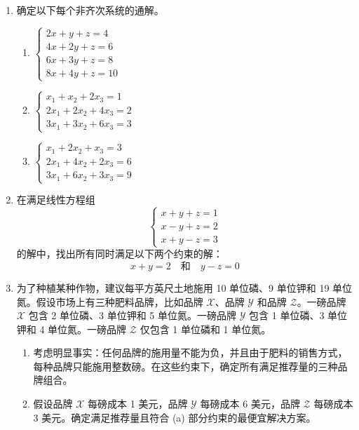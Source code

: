 \begin{enumerate}[leftmargin=*, label=\bfseries 2.5.\arabic*]
\item 确定以下每个非齐次系统的通解。
\begin{enumerate}[label=(\alph*)]
    \item \(
    \begin{cases}
    2x + y + z = 4 \\
    4x + 2y + z = 6 \\
    6x + 3y + z = 8 \\
    8x + 4y + z = 10
    \end{cases}
    \)
    \item \(
    \begin{cases}
    x_{1} + x_{2} + 2x_{3} = 1 \\
    2x_{1} + 2x_{2} + 4x_{3} = 2 \\
    3x_{1} + 3x_{2} + 6x_{3} = 3
    \end{cases}
    \)
    \item \(
    \begin{cases}
    x_{1} + 2x_{2} + x_{3} = 3 \\
    2x_{1} + 4x_{2} + 2x_{3} = 6 \\
    3x_{1} + 6x_{2} + 3x_{3} = 9
    \end{cases}
    \)
\end{enumerate}

\item 在满足线性方程组
\[
\begin{cases}
x + y + z = 1 \\
x - y + z = 2 \\
x + y - z = 3
\end{cases}
\]
的解中，找出所有同时满足以下两个约束的解：
\[
x + y = 2 \quad \text{和} \quad y - z = 0
\]

\item 为了种植某种作物，建议每平方英尺土地施用 10 单位磷、9 单位钾和 19 单位氮。假设市场上有三种肥料品牌，比如品牌 \(\mathcal{X}\)、品牌 \(\mathcal{Y}\) 和品牌 \(\mathcal{Z}\)。一磅品牌 \(\mathcal{X}\) 包含 2 单位磷、3 单位钾和 5 单位氮。一磅品牌 \(\mathcal{Y}\) 包含 1 单位磷、3 单位钾和 4 单位氮。一磅品牌 \(\mathcal{Z}\) 仅包含 1 单位磷和 1 单位氮。
\begin{enumerate}[label=(\alph*)]
    \item 考虑明显事实：任何品牌的施用量不能为负，并且由于肥料的销售方式，每种品牌只能施用整数磅。在这些约束下，确定所有满足推荐量的三种品牌组合。
    \item 假设品牌 \(\mathcal{X}\) 每磅成本 1 美元，品牌 \(\mathcal{Y}\) 每磅成本 6 美元，品牌 \(\mathcal{Z}\) 每磅成本 3 美元。确定满足推荐量且符合 (a) 部分约束的最便宜解决方案。
\end{enumerate}


\end{enumerate}
